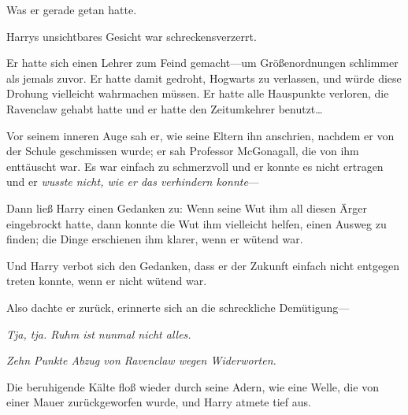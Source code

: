 Was er gerade getan hatte.

Harrys unsichtbares Gesicht war schreckensverzerrt.

Er hatte sich einen Lehrer zum Feind gemacht—um Größenordnungen schlimmer als jemals zuvor. Er hatte damit gedroht, Hogwarts zu verlassen, und würde diese Drohung vielleicht wahrmachen müssen. Er hatte alle Hauspunkte verloren, die Ravenclaw gehabt hatte und er hatte den Zeitumkehrer benutzt…

Vor seinem inneren Auge sah er, wie seine Eltern ihn anschrien, nachdem er von der Schule geschmissen wurde; er sah Professor McGonagall, die von ihm enttäuscht war. Es war einfach zu schmerzvoll und er konnte es nicht ertragen und er \emph{wusste nicht, wie er das verhindern konnte}—

Dann ließ Harry einen Gedanken zu: Wenn seine Wut ihm all diesen Ärger eingebrockt hatte, dann konnte die Wut ihm vielleicht helfen, einen Ausweg zu finden; die Dinge erschienen ihm klarer, wenn er wütend war.

Und Harry verbot sich den Gedanken, dass er der Zukunft einfach nicht entgegen treten konnte, wenn er nicht wütend war.

Also dachte er zurück, erinnerte sich an die schreckliche Demütigung—

\emph{Tja, tja. Ruhm ist nunmal nicht alles.}

\emph{Zehn Punkte Abzug von Ravenclaw wegen Widerworten.}

Die beruhigende Kälte floß wieder durch seine Adern, wie eine Welle, die von einer Mauer zurückgeworfen wurde, und Harry atmete tief aus.

